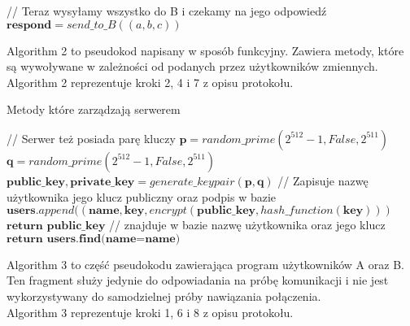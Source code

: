 \documentclass[11pt]{article}
\begin{document}
\begin{algorithm}
\begin{algorithmic}[1]
        \State // Teraz wysyłamy wszystko do B i czekamy na jego odpowiedź
        \State $\mathbf{respond} = send\_to\_B((a, b, c))$
	\end{algorithmic} 
\end{algorithm} 

\clearpage
Algorithm 2 to pseudokod napisany w sposób funkcyjny. Zawiera metody, które są wywoływane w zależności od podanych przez użytkowników zmiennych.\\
Algorithm 2 reprezentuje kroki 2, 4 i 7 z opisu protokołu.

\begin{algorithm}
	\caption{Metody które zarządzają serwerem}
	\begin{algorithmic}[1]
    	    \State // Serwer też posiada parę kluczy
    	    \State $\mathbf{p} = {random\_prime}(2^{512}-1,{False},2^{511})$
    	    \State $\mathbf{q} = {random\_prime}(2^{512}-1,{False},2^{511})$
    	    \State $\mathbf{public\_key, private\_key} = {generate\_keypair}(\mathbf{p}, \mathbf{q})$
        \EndProcedure
            \State // Zapisuje nazwę użytkownika jego klucz publiczny oraz podpis w bazie
            \State $\mathbf{users}.append((\mathbf{name}, \mathbf{key},   encrypt(\mathbf{public\_key}, hash\_function(\mathbf{key})))$
            \State  $\textbf{return public\_key}$
        \EndProcedure
            \State // znajduje w bazie nazwę użytkownika oraz jego klucz
            \State  $\textbf{return users.find(name=name)}$
        \EndProcedure
	\end{algorithmic}
\end{algorithm}

Algorithm 3 to część pseudokodu zawierająca program użytkowników A oraz B. Ten fragment służy jedynie do odpowiadania na próbę komunikacji i nie jest wykorzystywany do samodzielnej próby nawiązania połączenia.\\
Algorithm 3 reprezentuje kroki 1, 6 i 8 z opisu protokołu.
\end{document}
